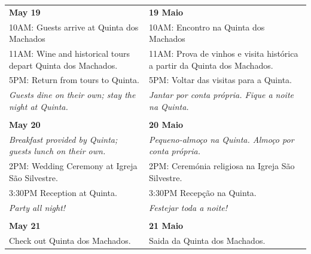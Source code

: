 \documentclass[6pt]{article}
\begin{document}
\pagestyle{empty}

\small 
\begin{tabular}{p{2.25in}|p{2.25in}}
  \textbf{May 19} & \textbf{19 Maio} \\
  {10AM:} Guests arrive at Quinta dos Machados
  &
  {10AM:} Encontro na Quinta dos Machados\\
  {11AM:} Wine and historical tours depart Quinta dos Machados. 
  &
  {11AM:} Prova de vinhos e visita histórica a partir da Quinta dos Machados.\\
  {5PM:} Return from tours to Quinta.
  &
  {5PM:} Voltar das visitas para a Quinta.
  \\
  {\it Guests dine on their own; stay the night at Quinta.}
  &
  {\it Jantar por conta própria. Fique a noite na Quinta.}\\
  &\\
  {\bf May 20} & {\bf 20 Maio} \\
  {\it Breakfast provided by Quinta; guests lunch on their own.}
  &
  {\it Pequeno-almoço na Quinta. Almoço por conta própria.}
  \\
  {2PM:} Wedding Ceremony at Igreja São Silvestre.
  &
  {2PM}: Ceremónia religiosa na Igreja São Silvestre.
  \\
  {3:30PM} Reception at Quinta.
  &
  {3:30PM} Recepção na Quinta.
  \\
  {\it Party all night!}&{\it Festejar toda a noite!}
  \\
  &\\
  {\bf May 21} & {\bf 21 Maio} \\
  Check out Quinta dos Machados. & Saida da Quinta dos Machados.
  
  
\end{tabular}
\end{document}
